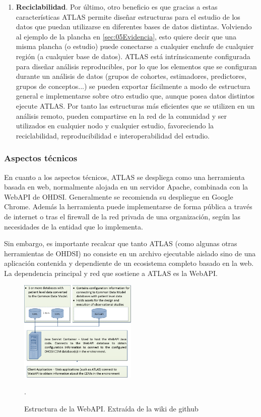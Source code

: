 \begin{enumerate}[label=\roman*.]
     \item \textbf{Reciclabilidad}. Por último, otro beneficio es que gracias a estas características ATLAS permite diseñar estructuras para el estudio de los datos que puedan utilizarse en diferentes bases de datos distintas. Volviendo al ejemplo de la plancha en \ref{sec:05Evidencia}, esto quiere decir que una misma plancha (o estudio) puede conectarse a cualquier enchufe de cualquier región (a cualquier base de datos). ATLAS está intrínsicamente configurada para diseñar análisis reproducibles, por lo que los elementos que se configuran durante un análisis de datos (grupos de cohortes, estimadores, predictores, grupos de conceptos...) se pueden exportar fácilmente a modo de estructura general e implementarse sobre otro estudio que, aunque posea datos distintos ejecute ATLAS. Por tanto las estructuras más eficientes que se utilizen en un análisis remoto, pueden compartirse en la red de la comunidad y ser utilizados en cualquier nodo y cualquier estudio, favoreciendo la reciclabilidad, reproducibilidad e interoperabilidad del estudio.
    
\end{enumerate}

\subsubsection{Aspectos técnicos}

En cuanto a los aspectos técnicos, ATLAS se despliega como una herramienta basada en web, normalmente alojada en un servidor Apache, combinada con la WebAPI de OHDSI. Generalmente se recomienda su despliegue en Google Chrome. Además la herramienta puede implementarse de forma pública a través de internet o tras el firewall de la red privada de una organización, según las necesidades de la entidad que lo implementa.

Sin embargo, es importante recalcar que tanto ATLAS (como algunas otras herramientas de OHDSI) no consiste en un archivo ejecutable aislado sino de una aplicación contenida y dependiente de un ecosistema completo basado en la web. La dependencia principal y red que sostiene a ATLAS es la WebAPI.

\begin{figure}[H]
    \centering
    \includegraphics[width=0.50\textwidth]{figures/webAPIwiki.png}
     \caption{Estructura de la WebAPI. Extraída de la wiki de github \cite{githubWebAPIwiki}}.
    \label{fig:webAPIwiki}
\end{figure}

